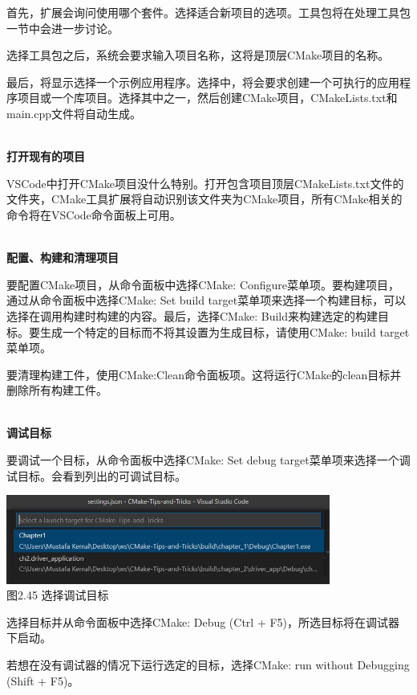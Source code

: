 首先，扩展会询问使用哪个套件。选择适合新项目的选项。工具包将在处理工具包一节中会进一步讨论。

选择工具包之后，系统会要求输入项目名称，这将是顶层CMake项目的名称。

最后，将显示选择一个示例应用程序。选择中，将会要求创建一个可执行的应用程序项目或一个库项目。选择其中之一，然后创建CMake项目，CMakeLists.txt和main.cpp文件将自动生成。

\hspace*{\fill} \\ %
\noindent
\textbf{打开现有的项目}

VSCode中打开CMake项目没什么特别。打开包含项目顶层CMakeLists.txt文件的文件夹，CMake工具扩展将自动识别该文件夹为CMake项目，所有CMake相关的命令将在VSCode命令面板上可用。

\hspace*{\fill} \\ %
\noindent
\textbf{配置、构建和清理项目}

要配置CMake项目，从命令面板中选择CMake: Configure菜单项。要构建项目，通过从命令面板中选择CMake: Set build target菜单项来选择一个构建目标，可以选择在调用构建时构建的内容。最后，选择CMake: Build来构建选定的构建目标。要生成一个特定的目标而不将其设置为生成目标，请使用CMake: build target菜单项。

要清理构建工件，使用CMake:Clean命令面板项。这将运行CMake的clean目标并删除所有构建工件。

\hspace*{\fill} \\ %
\noindent
\textbf{调试目标}

要调试一个目标，从命令面板中选择CMake: Set debug target菜单项来选择一个调试目标。会看到列出的可调试目标。

\begin{center}
\includegraphics[width=0.8\textwidth]{content/1/chapter2/images/45.jpg}\\
图2.45 选择调试目标
\end{center}

选择目标并从命令面板中选择CMake: Debug (Ctrl + F5)，所选目标将在调试器下启动。

若想在没有调试器的情况下运行选定的目标，选择CMake: run without Debugging (Shift + F5)。

